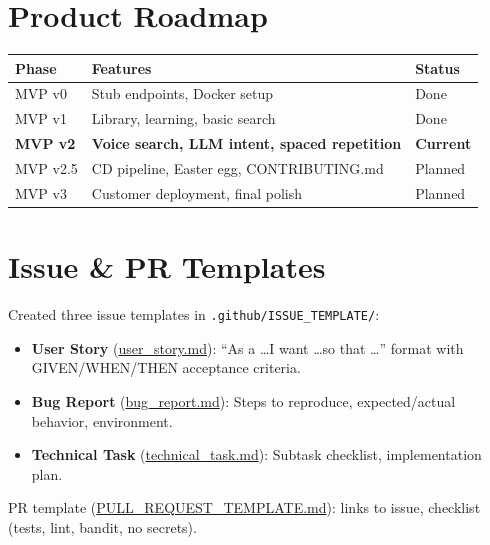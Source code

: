 \documentclass[11pt, a4paper]{article}
\begin{document}
\section{Product Roadmap}

\begin{tabularx}{\textwidth}{lXl}
\toprule
\textbf{Phase} & \textbf{Features} & \textbf{Status} \\
\midrule
MVP v0 & Stub endpoints, Docker setup & Done \\
MVP v1 & Library, learning, basic search & Done \\
\textbf{MVP v2} & \textbf{Voice search, LLM intent, spaced repetition} & \textbf{Current} \\
MVP v2.5 & CD pipeline, Easter egg, CONTRIBUTING.md & Planned \\
MVP v3 & Customer deployment, final polish & Planned \\
\bottomrule
\end{tabularx}

\section{Issue \& PR Templates}

Created three issue templates in \texttt{.github/ISSUE\_TEMPLATE/}:

\begin{itemize}
    \item \textbf{User Story} (\href{https://github.com/d13-l1t3/PoetryForYou/blob/main/.github/ISSUE_TEMPLATE/user_story.md}{user\_story.md}): ``As a \ldots I want \ldots so that \ldots'' format with GIVEN/WHEN/THEN acceptance criteria.
    \item \textbf{Bug Report} (\href{https://github.com/d13-l1t3/PoetryForYou/blob/main/.github/ISSUE_TEMPLATE/bug_report.md}{bug\_report.md}): Steps to reproduce, expected/actual behavior, environment.
    \item \textbf{Technical Task} (\href{https://github.com/d13-l1t3/PoetryForYou/blob/main/.github/ISSUE_TEMPLATE/technical_task.md}{technical\_task.md}): Subtask checklist, implementation plan.
\end{itemize}

PR template (\href{https://github.com/d13-l1t3/PoetryForYou/blob/main/.github/PULL_REQUEST_TEMPLATE.md}{PULL\_REQUEST\_TEMPLATE.md}): links to issue, checklist (tests, lint, bandit, no secrets).
\end{document}
